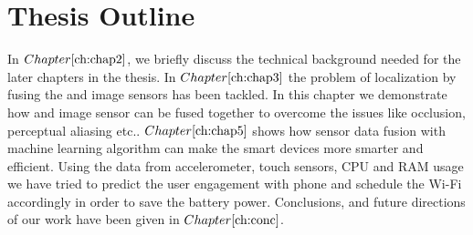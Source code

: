\section{Thesis Outline} 
\label{sec_thesis_outline}

In $Chapter \ref{ch:chap2}$, we briefly discuss the technical background needed for the later chapters in the thesis. In $Chapter \ref{ch:chap3}$ the problem of localization by fusing the \gps and image sensors has been tackled. In this chapter we demonstrate how \gps and image sensor can be fused together to overcome the issues like occlusion, perceptual aliasing etc.. $Chapter \ref{ch:chap5}$ shows how sensor data fusion with machine learning algorithm can make the smart devices more smarter and efficient. Using the data from accelerometer, touch sensors, CPU and RAM usage we have tried to predict the user engagement with phone and schedule the Wi-Fi accordingly in order to save the battery power. Conclusions, and future directions of our work have been given in $Chapter \ref{ch:conc}$.

\newpage








